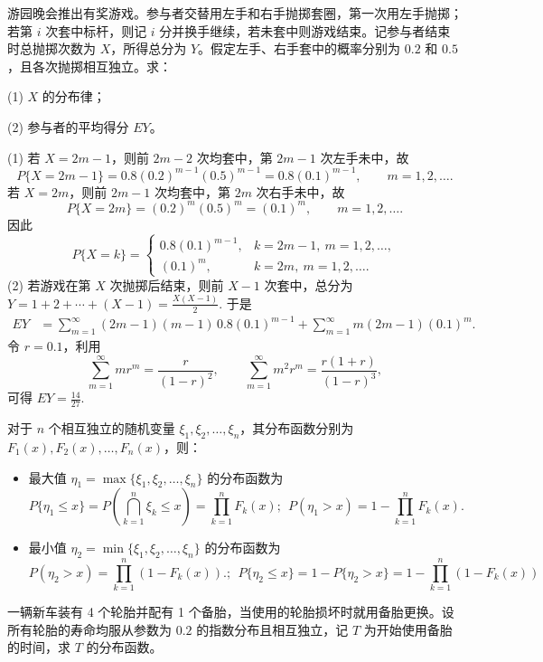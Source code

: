 \documentclass[lang=cn,11pt]{elegantbook}
\begin{document}
\begin{exercise}\label{exer:src-2012-b-08-2credit}
游园晚会推出有奖游戏。参与者交替用左手和右手抛掷套圈，第一次用左手抛掷；若第 \(i\) 次套中标杆，则记 \(i\) 分并换手继续，若未套中则游戏结束。记参与者结束时总抛掷次数为 \(X\)，所得总分为 \(Y\)。假定左手、右手套中的概率分别为 \(0.2\) 和 \(0.5\)，且各次抛掷相互独立。求：\par
(1) \(X\) 的分布律；\par
(2) 参与者的平均得分 \(EY\)。
\end{exercise}
\begin{solution}
(1) 若 \(X=2m-1\)，则前 \(2m-2\) 次均套中，第 \(2m-1\) 次左手未中，故
\[
P\{X=2m-1\}=0.8(0.2)^{m-1}(0.5)^{m-1}
=0.8(0.1)^{m-1},\qquad m=1,2,\dots.
\]
若 \(X=2m\)，则前 \(2m-1\) 次均套中，第 \(2m\) 次右手未中，故
\[
P\{X=2m\}=(0.2)^m(0.5)^{m}
=(0.1)^m,\qquad m=1,2,\dots.
\]
因此
\[
P\{X=k\}=
\begin{cases}
0.8(0.1)^{m-1}, & k=2m-1,\ m=1,2,\dots,\\
(0.1)^m, & k=2m,\ m=1,2,\dots.
\end{cases}
\]
(2) 若游戏在第 \(X\) 次抛掷后结束，则前 \(X-1\) 次套中，总分为
\(
Y=1+2+\cdots+(X-1)=\frac{X(X-1)}2.
\)
于是
\[
\begin{aligned}
EY
&=\sum_{m=1}^{\infty}(2m-1)(m-1)\,0.8(0.1)^{m-1}
 +\sum_{m=1}^{\infty}m(2m-1)(0.1)^m.
\end{aligned}
\]
令 \(r=0.1\)，利用
\[
\sum_{m=1}^{\infty}m r^m=\frac{r}{(1-r)^2},\qquad
\sum_{m=1}^{\infty}m^2 r^m=\frac{r(1+r)}{(1-r)^3},
\]
可得
\(
EY=\frac{14}{27}.
\)
\end{solution}

\begin{definition}[极值分布]\label{prop:extreme-value}
对于 $n$ 个相互独立的随机变量 $\xi_1,\xi_2,\dots,\xi_n$，其分布函数分别为 $F_1(x),F_2(x),\dots,F_n(x)$，则：
\begin{itemize}
    \item 最大值 $\eta_1 = \max\{\xi_1,\xi_2,\dots,\xi_n\}$ 的分布函数为
    \[ P\{\eta_1 \le x\} = P\left(\bigcap_{k=1}^n \xi_k \le x\right) = \prod_{k=1}^n F_k(x);~~P(\eta_1>x)=1-\prod_{k=1}^n F_k(x).\]
    \item 最小值 $\eta_2 = \min\{\xi_1,\xi_2,\dots,\xi_n\}$ 的分布函数为
    \[ P(\eta_2>x)=\prod_{k=1}^n (1-F_k(x)).;~~P\{\eta_2 \le x\} = 1 - P\{\eta_2 > x\}  = 1 - \prod_{k=1}^n (1-F_k(x))\]
\end{itemize}
\end{definition}


\begin{exercise} \label{exer:2-61}
一辆新车装有 4 个轮胎并配有 1 个备胎，当使用的轮胎损坏时就用备胎更换。设所有轮胎的寿命均服从参数为 $0.2$ 的指数分布且相互独立，记 $T$ 为开始使用备胎的时间，求 $T$ 的分布函数。
\end{exercise}
\end{document}
